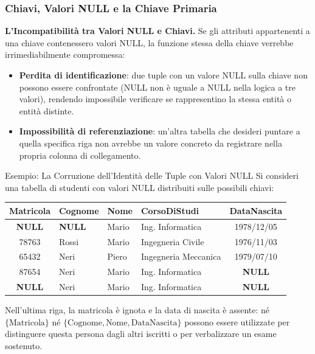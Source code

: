 \documentclass[12pt]{extarticle}
\begin{document}
\subsubsection{Chiavi, Valori NULL e la Chiave Primaria}
\noindent \textbf{L'Incompatibilità tra Valori NULL e Chiavi.} Se gli attributi appartenenti a una chiave contenessero valori NULL, la funzione stessa della chiave verrebbe irrimediabilmente compromessa:
\begin{itemize}
    \item \textbf{Perdita di identificazione}: due tuple con un valore NULL sulla chiave non possono essere confrontate (NULL non è uguale a NULL nella logica a tre valori), rendendo impossibile verificare se rappresentino la stessa entità o entità distinte.
    \item \textbf{Impossibilità di referenziazione}: un'altra tabella che desideri puntare a quella specifica riga non avrebbe un valore concreto da registrare nella propria colonna di collegamento.
\end{itemize}

\begin{cbox}{Esempio: La Corruzione dell'Identità delle Tuple con Valori NULL}
\noindent Si consideri una tabella di studenti con valori NULL distribuiti sulle possibili chiavi:
\begin{center}
\small
\begin{tabular}{clllc}
    \toprule
    \textbf{Matricola} & \textbf{Cognome} & \textbf{Nome} & \textbf{CorsoDiStudi} & \textbf{DataNascita} \\
    \midrule
    \textbf{NULL} & \textbf{NULL} & Mario & Ing. Informatica & 1978/12/05 \\
    78763 & Rossi & Mario & Ingegneria Civile & 1976/11/03 \\
    65432 & Neri & Piero & Ingegneria Meccanica & 1979/07/10 \\
    87654 & Neri & Mario & Ing. Informatica & \textbf{NULL} \\
    \textbf{NULL} & Neri & Mario & Ing. Informatica & \textbf{NULL} \\
    \bottomrule
\end{tabular}
\end{center}
\medskip
\noindent Nell'ultima riga, la matricola è ignota e la data di nascita è assente: né $\{\text{Matricola}\}$ né $\{\text{Cognome}, \text{Nome}, \text{DataNascita}\}$ possono essere utilizzate per distinguere questa persona dagli altri iscritti o per verbalizzare un esame sostenuto.
\end{cbox}
\end{document}
